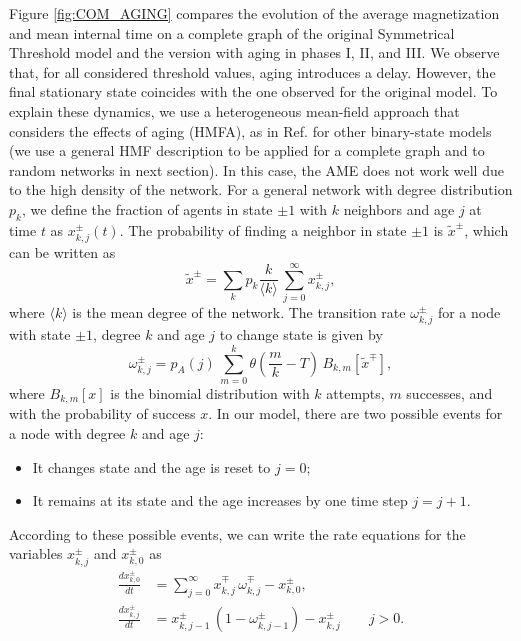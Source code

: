 	Figure \ref{fig:COM_AGING} compares the evolution of the average magnetization and mean internal time on a complete graph of the original Symmetrical Threshold model and the version with aging in phases I, II, and III. We observe that, for all considered threshold values, aging introduces a delay. However, the final stationary state coincides with the one observed for the original model. To explain these dynamics, we use a heterogeneous mean-field approach that considers the effects of aging (HMFA), as in Ref. \cite{chen-2020} for other binary-state models (we use a general HMF description to be applied for a complete graph and to random networks in next section). In this case, the AME does not work well due to the high density of the network. For a general network with degree distribution $p_k$, we define the fraction of agents in state $\pm 1$ with $k$ neighbors and age $j$ at time $t$ as $x^{\pm}_{k,j} (t)$. The probability of finding a neighbor in state $\pm 1$ is $\tilde{x}^{\pm}$, which can be written as 
	\begin{equation}
		\tilde{x}^{\pm} = \sum_k p_k \frac{k}{\langle k \rangle} \,  \sum_{j=0}^{\infty} x^{\pm}_{k,j},
	\end{equation}
	where $\langle k \rangle$ is the mean degree of the network. The transition rate $\omega_{k,j}^{\pm}$ for a node with state $\pm 1$, degree $k$ and age $j$ to change state is given by 
	\begin{equation}
		\omega_{k,j}^{\pm} = p_{A} (j) \,  \sum_{m=0}^{k} \theta\left(\frac{m}{k} - T\right) \,  B_{k,m}[\tilde{x}^{\mp}],
	\end{equation}
	where $B_{k,m}[x]$ is the binomial distribution with $k$ attempts, $m$ successes, and with the probability of success $x$. In our model, there are two possible events for a node with degree $k$ and age $j$:
	\begin{itemize}
		\item It changes state and the age is reset to $j = 0$;
		\item It remains at its state and the age increases by one time step $j = j + 1$.
	\end{itemize}
	According to these possible events, we can write the rate equations for the variables  $x^{\pm}_{k,j}$ and $x^{\pm}_{k,0}$ as
	\begin{eqnarray}
		\frac{dx^{\pm}_{k,0}}{dt} & = \sum_{j=0}^{\infty} x^{\mp}_{k,j} \,  \omega_{k,j}^{\mp} - x^{\pm}_{k,0},\nonumber\\
		\frac{dx^{\pm}_{k,j}}{dt} & =  x^{\pm}_{k,j-1} \,  ( 1 - \omega_{k,j-1}^{\pm}) - x^{\pm}_{k,j} \qquad j > 0. \label{eq:HMFaging2}
	\end{eqnarray}
